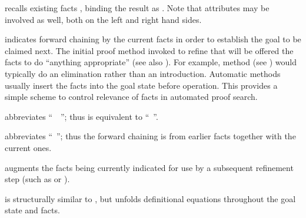 \begin{isabellebody}
\begin{isamarkuptext}
\begin{descr}
  \item [\mbox{\isa{\isacommand{note}}}~\isa{a\ {\isacharequal}\ b\isactrlsub {\isadigit{1}}\ {\isasymdots}\ b\isactrlsub n}]
  recalls existing facts , binding
  the result as .  Note that attributes may be involved as
  well, both on the left and right hand sides.

  \item [\mbox{\isa{\isacommand{then}}}] indicates forward chaining by the current
  facts in order to establish the goal to be claimed next.  The
  initial proof method invoked to refine that will be offered the
  facts to do ``anything appropriate'' (see also
  ).  For example, method \mbox{}
  (see ) would typically do an elimination
  rather than an introduction.  Automatic methods usually insert the
  facts into the goal state before operation.  This provides a simple
  scheme to control relevance of facts in automated proof search.
  
  \item [\mbox{\isa{\isacommand{from}}}~\isa{b}] abbreviates ``\mbox{}~~\mbox{}''; thus \mbox{} is
  equivalent to ``\mbox{}~''.
  
  \item [\mbox{\isa{\isacommand{with}}}~\isa{b\isactrlsub {\isadigit{1}}\ {\isasymdots}\ b\isactrlsub n}]
  abbreviates ``\mbox{}~''; thus the forward chaining is from earlier facts together
  with the current ones.
  
  \item [\mbox{\isa{\isacommand{using}}}~\isa{b\isactrlsub {\isadigit{1}}\ {\isasymdots}\ b\isactrlsub n}] augments
  the facts being currently indicated for use by a subsequent
  refinement step (such as \mbox{} or \mbox{}).
  
  \item [\mbox{\isa{\isacommand{unfolding}}}~\isa{b\isactrlsub {\isadigit{1}}\ {\isasymdots}\ b\isactrlsub n}] is
  structurally similar to \mbox{}, but unfolds definitional
  equations  throughout the goal state
  and facts.


\end{descr}
\end{isamarkuptext}
\end{isabellebody}
